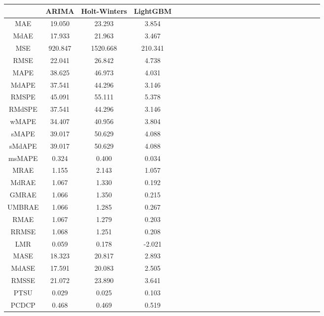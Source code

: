 \begin{tabular}{ccccccccccccccccccccccccc}
\toprule
 & ARIMA & Holt-Winters & LightGBM \\
\midrule
MAE & 19.050 & 23.293 & 3.854 \\
MdAE & 17.933 & 21.963 & 3.467 \\
MSE & 920.847 & 1520.668 & 210.341 \\
RMSE & 22.041 & 26.842 & 4.738 \\
MAPE & 38.625 & 46.973 & 4.031 \\
MdAPE & 37.541 & 44.296 & 3.146 \\
RMSPE & 45.091 & 55.111 & 5.378 \\
RMdSPE & 37.541 & 44.296 & 3.146 \\
wMAPE & 34.407 & 40.956 & 3.804 \\
sMAPE & 39.017 & 50.629 & 4.088 \\
sMdAPE & 39.017 & 50.629 & 4.088 \\
msMAPE & 0.324 & 0.400 & 0.034 \\
MRAE & 1.155 & 2.143 & 1.057 \\
MdRAE & 1.067 & 1.330 & 0.192 \\
GMRAE & 1.066 & 1.350 & 0.215 \\
UMBRAE & 1.066 & 1.285 & 0.267 \\
RMAE & 1.067 & 1.279 & 0.203 \\
RRMSE & 1.068 & 1.251 & 0.208 \\
LMR & 0.059 & 0.178 & -2.021 \\
MASE & 18.323 & 20.817 & 2.893 \\
MdASE & 17.591 & 20.083 & 2.505 \\
RMSSE & 21.072 & 23.890 & 3.641 \\
PTSU & 0.029 & 0.025 & 0.103 \\
PCDCP & 0.468 & 0.469 & 0.519 \\
\bottomrule
\end{tabular}
